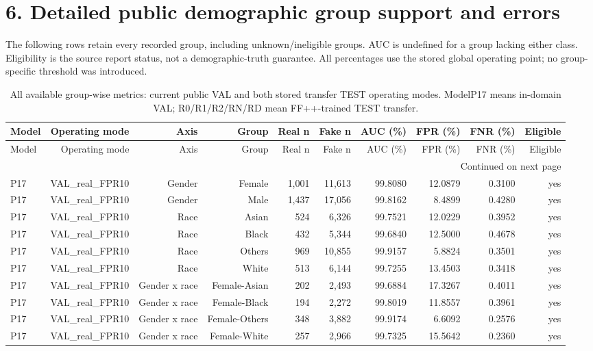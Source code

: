 \documentclass[10pt]{article}
\begin{document}
\section*{6. Detailed public demographic group support and errors}
The following rows retain every recorded group, including unknown/ineligible groups. AUC is undefined for a group lacking either class. Eligibility is the source report status, not a demographic-truth guarantee. All percentages use the stored global operating point; no group-specific threshold was introduced.

\begin{longtable}{@{}lrrrrrrrrr@{}}
\caption{All available group-wise metrics: current public VAL and both stored transfer TEST operating modes. ModelP17 means in-domain VAL; R0/R1/R2/RN/RD mean FF++-trained TEST transfer.}\\
\toprule
Model & Operating mode & Axis & Group & Real n & Fake n & AUC (\%) & FPR (\%) & FNR (\%) & Eligible \\
\midrule
\endfirsthead
\toprule
Model & Operating mode & Axis & Group & Real n & Fake n & AUC (\%) & FPR (\%) & FNR (\%) & Eligible \\
\midrule
\endhead
\midrule
\multicolumn{10}{r}{Continued on next page}\\
\endfoot
\bottomrule
\endlastfoot
P17 & VAL\_real\_FPR10 & Gender & Female & 1,001 & 11,613 & 99.8080 & 12.0879 & 0.3100 & yes \\
P17 & VAL\_real\_FPR10 & Gender & Male & 1,437 & 17,056 & 99.8162 & 8.4899 & 0.4280 & yes \\
P17 & VAL\_real\_FPR10 & Race & Asian & 524 & 6,326 & 99.7521 & 12.0229 & 0.3952 & yes \\
P17 & VAL\_real\_FPR10 & Race & Black & 432 & 5,344 & 99.6840 & 12.5000 & 0.4678 & yes \\
P17 & VAL\_real\_FPR10 & Race & Others & 969 & 10,855 & 99.9157 & 5.8824 & 0.3501 & yes \\
P17 & VAL\_real\_FPR10 & Race & White & 513 & 6,144 & 99.7255 & 13.4503 & 0.3418 & yes \\
P17 & VAL\_real\_FPR10 & Gender x race & Female-Asian & 202 & 2,493 & 99.6884 & 17.3267 & 0.4011 & yes \\
P17 & VAL\_real\_FPR10 & Gender x race & Female-Black & 194 & 2,272 & 99.8019 & 11.8557 & 0.3961 & yes \\
P17 & VAL\_real\_FPR10 & Gender x race & Female-Others & 348 & 3,882 & 99.9174 & 6.6092 & 0.2576 & yes \\
P17 & VAL\_real\_FPR10 & Gender x race & Female-White & 257 & 2,966 & 99.7325 & 15.5642 & 0.2360 & yes \\

\end{longtable}
\end{document}

